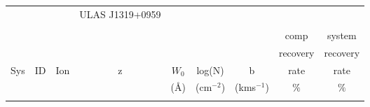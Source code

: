 \documentclass[12pt]{article}
\begin{document}
\begin{footnotesize}
\begin{longtable}{ c c c c c c c c c}  
			&	   &                           &            \Large{ULAS J1319+0959}    & 	& 					&							  	\\     
	     &        	&                           &				&				   &	                    &         	     		 	&  \\              
\hline                                                                                                                                                   
\hline                                                                                                                                                   
     	        &     	&                           &				&				   &	                    &         	     		 	& 		comp		& 		system	  	 \\    
                                                                                                                                                         
        &     	&                           &				&				   &	                    &         	     		 	& 		recovery			& 		recovery  	 \\    
   Sys  & ID  &   Ion     				   &  z 			&      $W_0$       &     log(N)				&    b						&   	rate	&   	rate   \\                      
          &         &                           &			&     	(\AA)		 &    (cm$^{-2}$)     &    (kms$^{ -1}$)	&        	$\%$	       & $\%$	\\         
		&	   &                           &            & 	& 					&							  	& \\                                                                 
                                                                                                                                                         

\end{longtable}
\end{footnotesize}
\end{document}
